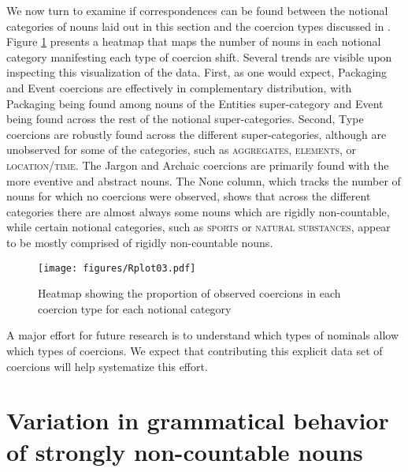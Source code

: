 \documentclass[output=paper]{langscibook}
\begin{document}
We now turn to examine if correspondences can be found between the notional categories of nouns laid out in this section and the coercion types discussed in .  Figure \ref{gri-ric:fig:heatmap} presents a heatmap that maps the number of nouns in each notional category manifesting each type of coercion shift.  Several trends are visible upon inspecting this visualization of the data.  First, as one would expect, Packaging and Event coercions are effectively in complementary distribution, with Packaging being found among nouns of the Entities super-category and Event being found across the rest of the notional super-categories.  Second, Type coercions are robustly found across the different super-categories, although are unobserved for some of the categories, such as \textsc{aggregates}, \textsc{elements}, or \textsc{location/time}.   The Jargon and Archaic coercions are primarily found with the more eventive and abstract nouns.  The None column, which tracks the number of nouns for which no coercions were observed, shows that across the different categories there are almost always some nouns which are rigidly non-countable, while certain notional categories, such as \textsc{sports} or \textsc{natural substances}, appear to be mostly comprised of rigidly non-countable nouns.



\begin{figure}
\texttt{[image: figures/Rplot03.pdf]}
\caption{Heatmap showing the proportion of observed coercions in each coercion type for each  notional category}
    \label{gri-ric:fig:heatmap}
\end{figure}


A major effort for  future research is to understand which types of nominals allow which types of coercions.  We expect that contributing this explicit data set of coercions will help systematize this effort.






\section{Variation in grammatical behavior of strongly non-countable nouns}\label{gri-ric:sec:quantitative}\largerpage[-2]
\end{document}
